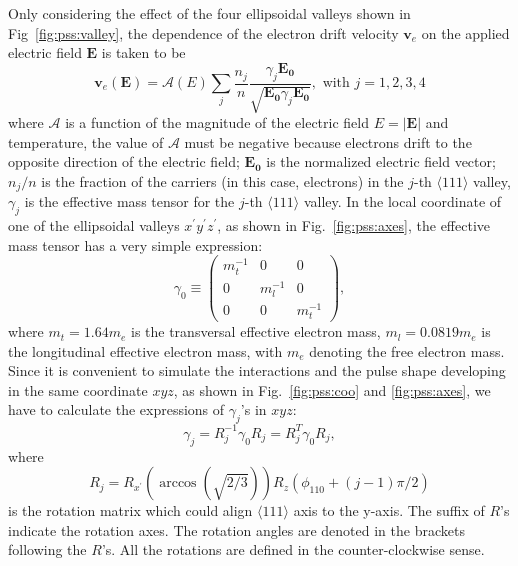 Only considering the effect of the four ellipsoidal valleys shown in Fig~\ref{fig:pss:valley}, the dependence of the electron drift velocity $\mathbf{v}_{e}$ on the applied electric field $\mathbf{E}$ is taken to be
\begin{equation}
  \label{eq:pss:ed}
  \mathbf{v}_{e}(\mathbf{E}) = \mathcal{A}(E) \sum_{j}     \frac{n_{j}}{n} \frac{\gamma_{j}\mathbf{E_{0}}}           {\sqrt{\mathbf{E_{0}}\gamma_{j}\mathbf{E_{0}}}}, \mbox{ with }           j=1,2,3,4
\end{equation}
where $\mathcal{A}$ is a function of the magnitude of the electric field $E=|\mathbf{E}|$ and temperature, the value of $\mathcal{A}$ must be negative because electrons drift to the opposite direction of the electric field; $\mathbf{E_{0}}$ is the normalized electric field vector; $n_{j}/n$ is the fraction of the carriers (in this case, electrons) in the $j$-th $\langle111\rangle$ valley, $\gamma_{j}$ is the effective mass tensor for the $j$-th $\langle111\rangle$ valley. In the local coordinate of one of the ellipsoidal valleys $x^{\prime}y^{\prime}z^{\prime}$, as shown in Fig.~\ref{fig:pss:axes}, the effective mass tensor has a very simple expression:
\begin{equation}
  \label{eq:pss:g0}
  \gamma_{0} \equiv \left(
    \begin{array}{ccc}
      m_{t}^{-1} & 0 & 0 \\
      0 & m_{l}^{-1} & 0 \\
      0 & 0 & m_{t}^{-1}
    \end{array} \right),
\end{equation}
where $m_{t} = 1.64m_{e}$ is the transversal effective electron mass, $m_{l} = 0.0819m_{e}$ is the longitudinal effective electron mass, with $m_{e}$ denoting the free electron mass. Since it is convenient to simulate the interactions and the pulse shape developing in the same coordinate $xyz$, as shown in Fig.~\ref{fig:pss:coo} and \ref{fig:pss:axes}, we have to calculate the expressions of $\gamma_{j}$'s in $xyz$:
\begin{equation}
  \label{eq:pss:gs}
  \gamma_{j} = R_{j}^{-1}\gamma_{0}R_{j} = R_{j}^{T}\gamma_{0}R_{j},
\end{equation}
where
\begin{equation}
  \label{eq:pss:rs}
  R_{j} = R_{x^{\prime}}(\arccos(\sqrt{2/3}))R_{z}(\phi_{110}+(j-1)\pi/2)
\end{equation}
is the rotation matrix which could align $\langle111\rangle$ axis to the y-axis. The suffix of $R$'s indicate the rotation axes. The rotation angles are denoted in the brackets following the $R$'s. All the rotations are defined in the counter-clockwise sense.

